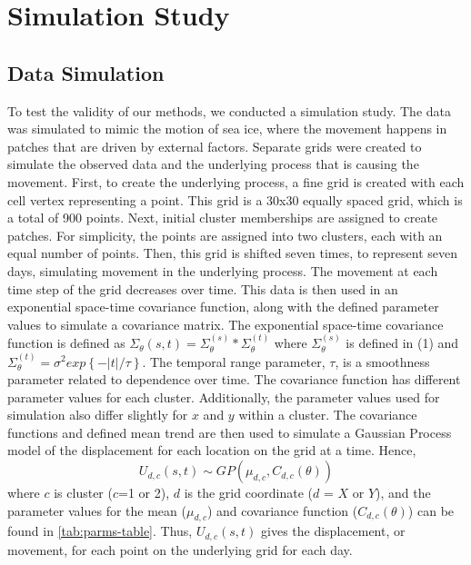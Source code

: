 \documentclass[12pt]{article}
\begin{document}
\hypertarget{simulation}{%
\section{Simulation Study}\label{simulation}}

\hypertarget{data-simulation}{%
\subsection{Data Simulation}\label{data-simulation}}

To test the validity of our methods, we conducted a simulation study.
The data was simulated to mimic the motion of sea ice, where the
movement happens in patches that are driven by external factors.
Separate grids were created to simulate the observed data and the
underlying process that is causing the movement. First, to create the
underlying process, a fine grid is created with each cell vertex
representing a point. This grid is a 30x30 equally spaced grid, which is
a total of 900 points. Next, initial cluster memberships are assigned to
create patches. For simplicity, the points are assigned into two
clusters, each with an equal number of points. Then, this grid is
shifted seven times, to represent seven days, simulating movement in the
underlying process. The movement at each time step of the grid decreases
over time. This data is then used in an exponential space-time
covariance function, along with the defined parameter values to simulate
a covariance matrix. The exponential space-time covariance function is
defined as
\(\Sigma_{\theta}(s,t) = \Sigma_{\theta}^{(s)} * \Sigma_{\theta}^{(t)}\)
where \(\Sigma_{\theta}^{(s)}\) is defined in (1) and
\(\Sigma_{\theta}^{(t)} = \sigma^2 exp\left\{-|t|/\tau\right\}\). The
temporal range parameter, \(\tau\), is a smoothness parameter related to
dependence over time. The covariance function has different parameter
values for each cluster. Additionally, the parameter values used for
simulation also differ slightly for \(x\) and \(y\) within a cluster.
The covariance functions and defined mean trend are then used to
simulate a Gaussian Process model of the displacement for each location
on the grid at a time. Hence,
\[ U_{d,c}(s,t) \sim GP(\mu_{d,c}, C_{d,c}(\theta))\] where \(c\) is
cluster (\(c\)=1 or 2), \(d\) is the grid coordinate (\(d\) = \(X\) or
\(Y\)), and the parameter values for the mean (\(\mu_{d,c}\)) and
covariance function (\(C_{d,c}(\theta)\)) can be found in
\cref{tab:parms-table}. Thus, \(U_{d,c}(s,t)\) gives the displacement,
or movement, for each point on the underlying grid for each day.
\end{document}
